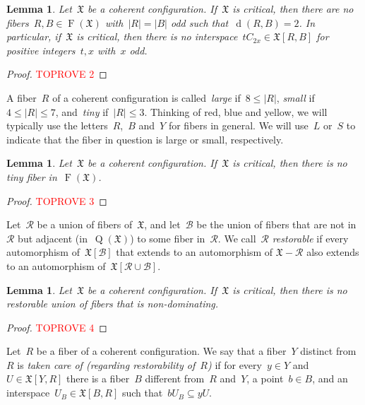 \documentclass[english,a4paper]{article}
\theoremstyle{plain}
\newtheorem{lemma}      [theorem]{Lemma}
\theoremstyle{definition}
\newcommand{\abs}[1]{| #1 |}
\DeclareMathOperator{\Fibers}{F}
\newcommand{\coherentConfig}{\ensuremath{\mathfrak{X}}}
\newcommand{\fibers}[1]{\ensuremath{\Fibers \left( #1 \right)}}
\newcommand{\interspace}[2]{\ensuremath{\coherentConfig[#1,#2]}}
\newcommand{\minimalDegree}[2]{\Deg(#1,#2)}
\DeclareMathOperator*{\Quotient}{Q}
\newcommand{\quotientGraph}[1]{\ensuremath{\Quotient(#1)}}
\DeclareMathOperator{\Deg}{d}
\newcommand{\cycle}[1]{\ensuremath{C_{#1}}}
\newcommand{\disjointCycles}[2]{\ensuremath{#1 \cycle{#2}}}
\begin{document}
\begin{lemma}
\label{critical:cycle/lem}
    Let~$\coherentConfig$ be a coherent configuration.
    If~$\coherentConfig$ is critical, then there are no fibers~$R,B\in \fibers{\coherentConfig}$ with~$|R|=|B|$ odd such that~$\minimalDegree{R}{B}=2$.
    In particular, if~$\coherentConfig$ is critical, then there is no interspace~$\disjointCycles{t}{2x} \in \interspace{R}{B}$ for positive integers~$t,x$ with~$x$ odd.
\end{lemma}
\begin{proof}\textcolor{red}{TOPROVE 2}\end{proof}


A fiber~$R$ of a coherent configuration is called~\emph{large} if~$8 \leq \abs{R}$, \emph{small} if~$4 \leq \abs{R} \leq 7$, and~\emph{tiny} if~$\abs{R} \leq 3$.
Thinking of red, blue and yellow, we will typically use the letters~$R$,~$B$ and~$Y$ for fibers in general. We will use~$L$ or~$S$ to indicate that the fiber in question is large or small, respectively.


\begin{lemma}
\label{critical:tiny-CC/lem}
    Let~$\coherentConfig$ be a coherent configuration.
    If~$\coherentConfig$ is critical, then there is no tiny fiber in~$\fibers{\coherentConfig}$.
\end{lemma}
\begin{proof}\textcolor{red}{TOPROVE 3}\end{proof}


Let~$\mathcal{R}$ be a union of fibers of~$\coherentConfig$, and let~$\mathcal{B}$ be the union of fibers that are not in~$\mathcal{R}$ but adjacent (in~$\quotientGraph{\coherentConfig}$) to some fiber in~$\mathcal{R}$.
We call~$\mathcal{R}$ \emph{restorable} if every automorphism of~$\coherentConfig[\mathcal{B}]$ that extends to an automorphism of
$\coherentConfig-\mathcal{R}$ also extends to an automorphism of~$\coherentConfig[\mathcal{R} \cup \mathcal{B}]$.


\begin{lemma}
\label{critical:restorable/lem}
    Let~$\coherentConfig$ be a coherent configuration.
    If~$\coherentConfig$ is critical, then there is no restorable union of fibers that is non-dominating.
\end{lemma}
\begin{proof}\textcolor{red}{TOPROVE 4}\end{proof}



Let~$R$ be a fiber of a coherent configuration. We say that a fiber~$Y$ distinct from~$R$ is \emph{taken care of (regarding restorability of~$R$)} if for every~$y\in Y$ and~$U\in \interspace{Y}{R}$ there is a fiber~$B$  different from~$R$ and~$Y$, a point~$b\in B$, and an interspace~$U_B\in \interspace{B}{R}$  such that~$bU_B\subseteq yU$.
\end{document}
